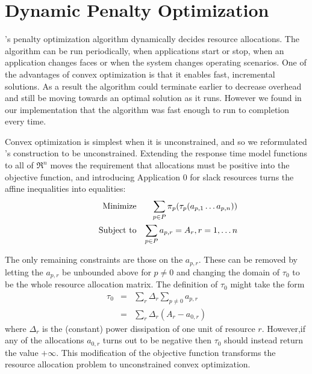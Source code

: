 \section{Dynamic Penalty Optimization}\label{dyn_opt}


\pacora's penalty optimization algorithm dynamically decides resource allocations. The algorithm can be run periodically, when applications start or stop, when an application changes faces or when the system changes operating scenarios.  One of the advantages of convex optimization is that it enables fast, incremental solutions.  As a result the algorithm could terminate earlier to decrease overhead and still be moving towards an optimal solution as it runs.  However we found in our implementation that the algorithm was fast enough to run to completion every time. 

Convex optimization is simplest when it is unconstrained, and so we reformulated \pacora's construction to be unconstrained.
Extending the response time model functions to all of $\Re^n$
moves the requirement that allocations must be positive into the objective function,
and introducing Application 0 for slack resources turns the affine inequalities into equalities:
\begin{eqnarray*}
& \makebox[1in][r]{Minimize}   & \sum_{p\in P} {\pi_p(\tau_p(a_{p,1}\ldots a_{p,n}))}  \\
& \makebox[1in][r]{Subject to} & \sum_{p\in P} a_{p,r} = A_r, r = 1,\ldots n           \\
\end{eqnarray*}

The only remaining constraints are those on the $a_{p,r}$.
These can be removed by letting the $a_{p,r}$ be unbounded above for $p \neq 0$
and changing the domain of $\tau_0$  to be the whole resource allocation matrix.
The definition of $\tau_0$ might take the form
\begin{eqnarray*}
\tau_0 &=& \sum_r \Delta_r \sum_{p \neq 0} a_{p,r}     \\
       &=& \sum_r \Delta_r (A_r - a_{0,r})
\end{eqnarray*}
where $\Delta_r$ is the (constant) power dissipation of one unit of resource $r$.
However,if any of the allocations $a_{0,r}$ turns out to be negative then $\tau_0$  should instead return the value $+\infty$.
This modification of the objective function transforms the resource allocation problem
to unconstrained convex optimization.  


